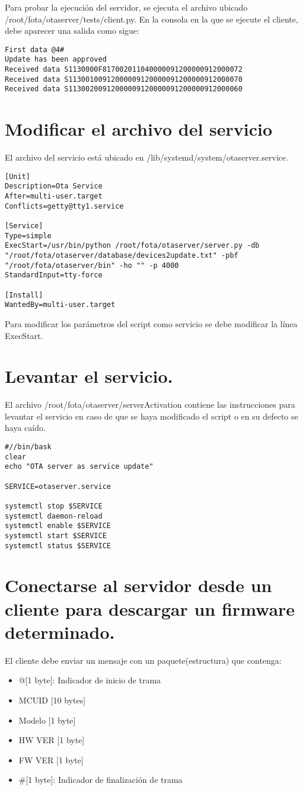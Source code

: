 \documentclass[11pt]{article}
\begin{document}
Para probar la ejecución del servidor, se ejecuta el archivo ubicado /root/fota/otaserver/tests/client.py. En la consola en la que se ejecute el cliente, debe aparecer una salida como sigue:
\begin{verbatim}
First data @4#
Update has been approved
Received data S1130000F817002011040000091200000912000072
Received data S11300100912000009120000091200000912000070
Received data S11300200912000009120000091200000912000060
\end{verbatim}

\section{Modificar el archivo del servicio}
El archivo del servicio está ubicado en /lib/systemd/system/otaserver.service.

\begin{verbatim}
[Unit]
Description=Ota Service
After=multi-user.target
Conflicts=getty@tty1.service

[Service]
Type=simple
ExecStart=/usr/bin/python /root/fota/otaserver/server.py -db "/root/fota/otaserver/database/devices2update.txt" -pbf "/root/fota/otaserver/bin" -ho "" -p 4000
StandardInput=tty-force

[Install]
WantedBy=multi-user.target
\end{verbatim}

Para modificar los parámetros del script como servicio se debe modificar la línea ExecStart.

\section{Levantar el servicio.}
El archivo /root/fota/otaserver/serverActivation contiene las instrucciones para levantar el servicio en caso de que se haya modificado el script o en su defecto se haya caído.

\begin{verbatim}
#//bin/bask
clear
echo "OTA server as service update"

SERVICE=otaserver.service

systemctl stop $SERVICE
systemctl daemon-reload
systemctl enable $SERVICE
systemctl start $SERVICE
systemctl status $SERVICE
\end{verbatim}

\section{Conectarse al servidor desde un cliente para descargar un firmware determinado.}
El cliente debe enviar un mensaje con un paquete(estructura) que contenga:
\begin{itemize}
\item @[1 byte]: Indicador de inicio de trama
\item MCUID [10 bytes]
\item Modelo [1 byte]
\item HW VER [1 byte]
\item FW VER [1 byte]
\item \#[1 byte]: Indicador de finalización de trama
\end{itemize}
\end{document}
